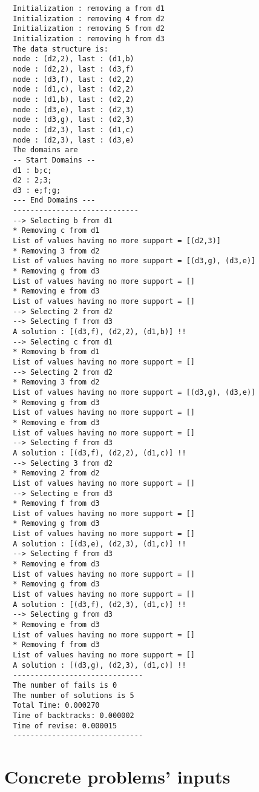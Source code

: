 \documentclass{rapport}
\begin{document}
\begin{verbatim}
  Initialization : removing a from d1  
  Initialization : removing 4 from d2
  Initialization : removing 5 from d2
  Initialization : removing h from d3
  The data structure is:
  node : (d2,2), last : (d1,b) 
  node : (d2,2), last : (d3,f) 
  node : (d3,f), last : (d2,2) 
  node : (d1,c), last : (d2,2) 
  node : (d1,b), last : (d2,2) 
  node : (d3,e), last : (d2,3) 
  node : (d3,g), last : (d2,3) 
  node : (d2,3), last : (d1,c) 
  node : (d2,3), last : (d3,e) 
  The domains are
  -- Start Domains --
  d1 : b;c;
  d2 : 2;3;
  d3 : e;f;g;
  --- End Domains ---
  -----------------------------
  --> Selecting b from d1
  * Removing c from d1
  List of values having no more support = [(d2,3)]
  * Removing 3 from d2
  List of values having no more support = [(d3,g), (d3,e)]
  * Removing g from d3
  List of values having no more support = []
  * Removing e from d3
  List of values having no more support = []
  --> Selecting 2 from d2
  --> Selecting f from d3
  A solution : [(d3,f), (d2,2), (d1,b)] !!
  --> Selecting c from d1
  * Removing b from d1
  List of values having no more support = []
  --> Selecting 2 from d2
  * Removing 3 from d2
  List of values having no more support = [(d3,g), (d3,e)]
  * Removing g from d3
  List of values having no more support = []
  * Removing e from d3
  List of values having no more support = []
  --> Selecting f from d3
  A solution : [(d3,f), (d2,2), (d1,c)] !!
  --> Selecting 3 from d2
  * Removing 2 from d2
  List of values having no more support = []
  --> Selecting e from d3
  * Removing f from d3
  List of values having no more support = []
  * Removing g from d3
  List of values having no more support = []
  A solution : [(d3,e), (d2,3), (d1,c)] !!
  --> Selecting f from d3
  * Removing e from d3
  List of values having no more support = []
  * Removing g from d3
  List of values having no more support = []
  A solution : [(d3,f), (d2,3), (d1,c)] !!
  --> Selecting g from d3
  * Removing e from d3
  List of values having no more support = []
  * Removing f from d3
  List of values having no more support = []
  A solution : [(d3,g), (d2,3), (d1,c)] !!
  ------------------------------
  The number of fails is 0
  The number of solutions is 5
  Total Time: 0.000270
  Time of backtracks: 0.000002
  Time of revise: 0.000015
  ------------------------------
\end{verbatim}

\section{Concrete problems' inputs}
\end{document}
